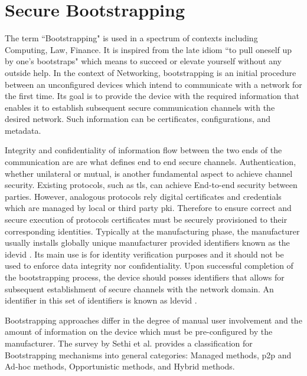 \chapter{Secure Bootstrapping}
\label{ch:secureBootstrapping}
The term ``Bootstrapping" is used in a spectrum of contexts including Computing, Law, Finance. It is inspired from the late idiom ``to pull oneself up by one's bootstraps" which means to succeed or elevate yourself without any outside help. In the context of Networking, bootstrapping is an initial procedure between an unconfigured devices which intend to communicate with a network for the first time. Its goal is to provide the device with the required information that enables it to establish subsequent secure communication channels with the desired network. Such information can be certificates, configurations, and metadata.
\par
Integrity and confidentiality of information flow between the two ends of the communication are are what defines end to end secure channels. Authentication, whether unilateral or mutual, is another fundamental aspect to achieve channel security. Existing protocols, such as \gls{tls}, can achieve End-to-end security between parties. However, analogous protocols rely digital certificates and credentials which are managed by local or third party \gls{pki}. Therefore to ensure correct and secure execution of protocols certificates must be securely provisioned to their corresponding identities. Typically at the manufacturing phase, the manufacturer usually installs globally unique manufacturer provided identifiers known as the \gls{idevid} \cite{5367679}. Its main use is for identity verification purposes and it should not be used to enforce data integrity nor confidentiality. Upon successful completion of the bootstrapping process, the device should posses identifiers that allows for subsequent establishment of secure channels with the network domain. An identifier in this set of identifiers is known as \gls{ldevid} \cite{5367679}.
\par
Bootstrapping approaches differ in the degree of manual user involvement and the amount of information on the device which must be pre-configured by the manufacturer. The survey by Sethi et al. \cite{irtf-t2trg-secure-bootstrapping-00} provides a classification for Bootstrapping mechanisms into general categories: Managed methods, \gls{p2p} and Ad-hoc methods, Opportunistic methods, and Hybrid methods.
